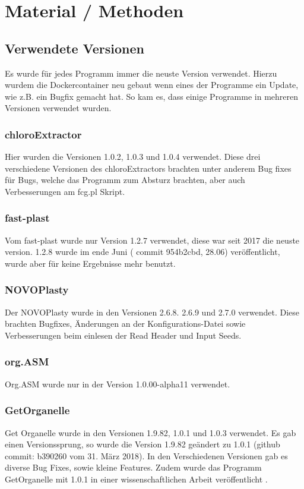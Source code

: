 \documentclass{scrartcl}
\begin{document}
\section{Material / Methoden}
\label{sec-3}
\subsection{Verwendete Versionen}
\label{sec-3-1}
Es wurde für jedes Programm immer die neuste Version verwendet. Hierzu wurdem die Dockercontainer neu gebaut wenn eines der Programme ein Update, wie z.B. ein Bugfix gemacht hat.
So kam es, dass einige Programme in mehreren Versionen verwendet wurden.
\subsubsection{chloroExtractor}
\label{sec-3-1-1}
Hier wurden die Versionen 1.0.2, 1.0.3 und 1.0.4 verwendet. Diese drei verschiedene Versionen des chloroExtractors brachten unter anderem Bug fixes für Bugs, welche das 
Programm zum Absturz brachten, aber auch Verbesserungen am fcg.pl Skript. 
\subsubsection{fast-plast}
\label{sec-3-1-2}
Vom fast-plast wurde nur Version 1.2.7 verwendet, diese war seit 2017 die neuste version. 1.2.8 wurde im ende Juni ( commit 954b2cbd, 28.06) veröffentlicht, wurde aber für keine Ergebnisse mehr benutzt.
\subsubsection{NOVOPlasty}
\label{sec-3-1-3}
Der NOVOPlasty wurde in den Versionen 2.6.8. 2.6.9 und 2.7.0 verwendet. Diese brachten Bugfixes, Änderungen an der Konfigurations-Datei sowie Verbesserungen beim einlesen der Read Header und Input Seeds.
\subsubsection{org.ASM}
\label{sec-3-1-4}
Org.ASM wurde nur in der Version 1.0.00-alpha11 verwendet. 
\subsubsection{GetOrganelle}
\label{sec-3-1-5}
Get Organelle wurde in den Versionen 1.9.82, 1.0.1 und 1.0.3 verwendet. Es gab einen Versionssprung, so wurde die Version 1.9.82 geändert zu 1.0.1 (github commit: b390260 vom 31. März 2018). In den Verschiedenen Versionen gab es diverse Bug Fixes, sowie
kleine Features. Zudem wurde das Programm GetOrganelle mit 1.0.1 in einer wissenschaftlichen Arbeit veröffentlicht \footnotemark[32]{}.
\end{document}
